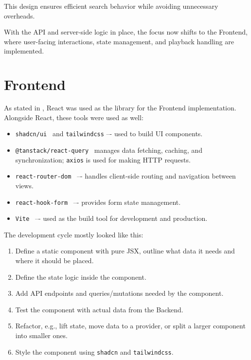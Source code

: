 This design ensures efficient search behavior while avoiding unnecessary overheads.

With the API and server-side logic in place, the focus now shifts to the Frontend, where user-facing interactions, state management, and playback handling are implemented.


\section{Frontend}
As stated in , React was used as the library for the Frontend implementation.
Alongside React, these tools were used as well:
\begin{itemize}
    \item \texttt{shadcn/ui}~\cite{shadcn} and \texttt{tailwindcss} –-
    used to build UI components.

    \item \texttt{@tanstack/react-query}~\cite{tanstack}
    manages data fetching, caching, and synchronization;
    \texttt{axios} is used for making HTTP requests.

    \item \texttt{react-router-dom}~\cite{reactrouterdom} –- handles client-side routing and navigation between views.

    \item \texttt{react-hook-form}~\cite{reacthookform} –- provides form state management.

    \item \texttt{Vite}~\cite{vite} –- used as the build tool for development and production.
\end{itemize}

The development cycle mostly looked like this:
\begin{enumerate}
    \item Define a static component with pure JSX, outline what data it needs and where it should be placed.
    \item Define the state logic inside the component.
    \item Add API endpoints and queries/mutations needed by the component.
    \item Test the component with actual data from the Backend.
    \item Refactor, e.g., lift state, move data to a provider, or split a larger component into smaller ones.
    \item Style the component using \texttt{shadcn} and \texttt{tailwindcss}.
\end{enumerate}

